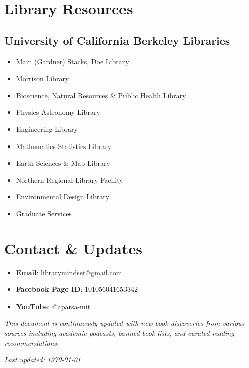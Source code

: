 \documentclass[11pt,a4paper]{article}
\newcommand{\bookentry}[5][none]{%
  \item 
  \ifx&#1&%
    \textbf{#2} \\
  \else
    \if#1f%
      \colorbox{finishedbg}{\textcolor{finishedcolor}{\textbf{✓ FINISHED}}} \textbf{#2} \\
    \fi
    \if#1p%
      \colorbox{inprogressbg}{\textcolor{inprogresscolor}{\textbf{⟳ IN PROGRESS}}} \textbf{#2} \\
    \fi
    \if#1t%
      \colorbox{toreadbg}{\textcolor{toreadcolor}{\textbf{○ TO READ}}} \textbf{#2} \\
    \fi
  \fi
  \textit{Author:} #3 \\
  \textit{Year:} #4 \\
  #5
}
\begin{document}

\appendix

\section{Library Resources}

\subsection{University of California Berkeley Libraries}
\begin{itemize}
  \item Main (Gardner) Stacks, Doe Library
  \item Morrison Library
  \item Bioscience, Natural Resources \& Public Health Library
  \item Physics-Astronomy Library
  \item Engineering Library
  \item Mathematics Statistics Library
  \item Earth Sciences \& Map Library
  \item Northern Regional Library Facility
  \item Environmental Design Library
  \item Graduate Services
\end{itemize}

\section{Contact \& Updates}

\begin{itemize}
  \item \textbf{Email}: librarymindset@gmail.com
  \item \textbf{Facebook Page ID}: 101056041653342
  \item \textbf{YouTube}: @aparsa-mit
\end{itemize}

\vspace{1cm}

\noindent\textit{This document is continuously updated with new book discoveries from various sources including academic podcasts, banned book lists, and curated reading recommendations.}

\vspace{0.5cm}

\noindent\textit{Last updated: \today}
\end{document}
